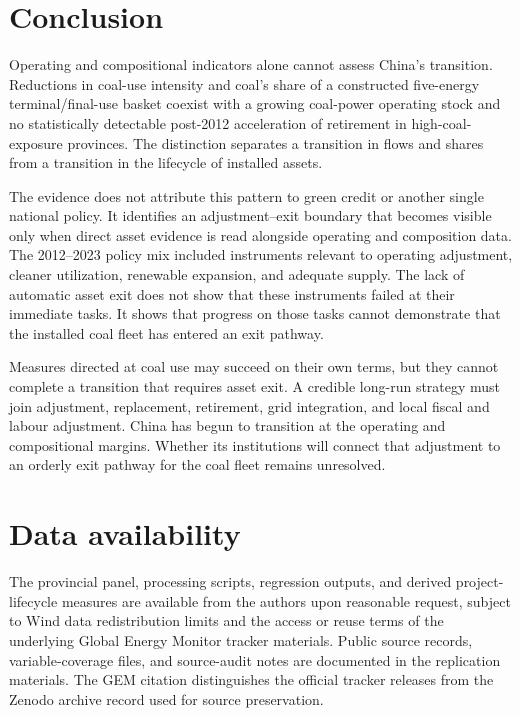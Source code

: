 \documentclass[11pt]{article}
\begin{document}
\section{Conclusion}

Operating and compositional indicators alone cannot assess China's transition. Reductions in coal-use intensity and coal's share of a constructed five-energy terminal/final-use basket coexist with a growing coal-power operating stock and no statistically detectable post-2012 acceleration of retirement in high-coal-exposure provinces. The distinction separates a transition in flows and shares from a transition in the lifecycle of installed assets.

The evidence does not attribute this pattern to green credit or another single national policy. It identifies an adjustment--exit boundary that becomes visible only when direct asset evidence is read alongside operating and composition data. The 2012--2023 policy mix included instruments relevant to operating adjustment, cleaner utilization, renewable expansion, and adequate supply. The lack of automatic asset exit does not show that these instruments failed at their immediate tasks. It shows that progress on those tasks cannot demonstrate that the installed coal fleet has entered an exit pathway.

Measures directed at coal use may succeed on their own terms, but they cannot complete a transition that requires asset exit. A credible long-run strategy must join adjustment, replacement, retirement, grid integration, and local fiscal and labour adjustment. China has begun to transition at the operating and compositional margins. Whether its institutions will connect that adjustment to an orderly exit pathway for the coal fleet remains unresolved.

\section*{Data availability}
The provincial panel, processing scripts, regression outputs, and derived project-lifecycle measures are available from the authors upon reasonable request, subject to Wind data redistribution limits and the access or reuse terms of the underlying Global Energy Monitor tracker materials. Public source records, variable-coverage files, and source-audit notes are documented in the replication materials. The GEM citation distinguishes the official tracker releases from the Zenodo archive record used for source preservation.
\end{document}
